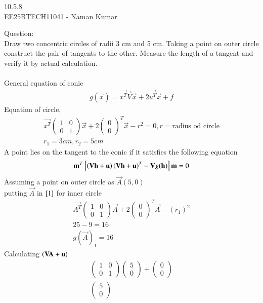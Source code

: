 \documentclass[a5paper,10pt]{article}
\author{EE25BTECH11041-Naman Kumar }
\begin{document}
\begin{center}
    \huge{10.5.8}\\
    \large{EE25BTECH11041 - Naman Kumar}
\end{center}
Question:\\
Draw two concentric circles of radii 3 cm and 5 cm. Taking a point on outer circle construct the pair of tangents to the other. Measure the length of a tangent and verify it by actual calculation.\\
\solution \\
General equation of conic
\begin{align}
    g(\vec{x})=\vec{x^T}\vec{V}\vec{x}+2\vec{u^T}\vec{x}+f 
\end{align}
Equation of circle,
\begin{align}
    \vec{x^T}\begin{pmatrix}1&0\\0&1\end{pmatrix}\vec{x}+2\begin{pmatrix}0\\0\end{pmatrix}^T\vec{x}-r^2=0,\label{1} r=\text{radius od circle}\\
    r_1=3cm , r_2=5cm
\end{align}
A point lies on the tangent to the conic if it satisfies the following equation
\begin{align}
    \mathbf{m}^T{}\left[\left(\mathbf{V}\mathbf{h}+\mathbf{u}\right)\left(\mathbf{V}\mathbf{h}+\mathbf{u}\right)^T-\mathbf{V}g(\mathbf{h})\right]\mathbf{m}=0 \label{2}
\end{align}
Assuming a point on outer circle as $\vec{A}(5,0)$\\
putting $\vec{A}$ in $\eqref{1}$ for inner circle
\begin{align}
    \vec{A^T}\begin{pmatrix}1&0\\0&1\end{pmatrix}\vec{A}+2\begin{pmatrix}0\\0\end{pmatrix}^T\vec{A}-(r_1)^2\\
    25-9=16\\
    g(\vec{A})_1=16
\end{align}
Calculating $\left(\mathbf{V}\mathbf{A}+\mathbf{u}\right)$
\begin{align}
    \begin{pmatrix}1&0\\0&1\end{pmatrix}\begin{pmatrix}5\\0\end{pmatrix}+\begin{pmatrix}0\\0\end{pmatrix}\\
    \begin{pmatrix}5\\0\end{pmatrix}    
\end{align}
\end{document}
